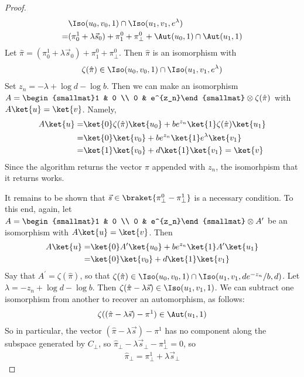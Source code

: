 \begin{proof}
\begin{align}
		& \Iso(u_0,v_0,1)\cap \Iso(u_1,v_1,e^\lambda) \\
		= & (\pi_0^1 + \lambda\vec s_0) + \pi_1^0 + \pi_\bot^0 + \Aut(u_0,1)\cap \Aut(u_1,1)
	\end{align}
	Let $\hat\pi = (\pi_0^1 + \lambda\vec s_0) + \pi_1^0 + \pi_\bot^0$.
	Then $\hat\pi$ is an isomorphism with 
	\begin{align}
		\zeta(\hat\pi) \in \Iso(u_0,v_0,1)\cap \Iso(u_1,v_1,e^\lambda)
	\end{align}
	Set $z_n=-\lambda+\log d - \log b$.
	Then we can make an isomorphism $A=\begin{smallmat}1 & 0 \\ 0 & e^{z_n}\end{smallmat}\otimes \zeta(\hat\pi)$ with $A\ket{u}=\ket{v}$.
	Namely,
	\begin{align}
		A\ket{u} = & \ket{0}\zeta(\hat\pi)\ket{u_0} + be^{z_n}\ket{1}\zeta(\hat\pi)\ket{u_1} \\
		= & \ket{0}\ket{v_0} + be^{z_n}\ket{1}e^{\lambda}\ket{v_1} \\
		= & \ket{1}\ket{v_0} + d\ket{1}\ket{v_1} = \ket{v}
	\end{align}
	Since the algorithm returns the vector $\hat\pi$ appended with $z_n$, the isomorhpism that it returns works.
	
	It remains to be shown that $\vec s\in \braket{\pi_\bot^0 - \pi_\bot^1}$ is a necessary condition.
	To this end, again, let $A=\begin{smallmat}1 & 0 \\ 0 & e^{z_n}\end{smallmat}\otimes A^\prime$ be an isomorphism with $A\ket{u}=\ket{v}$.
	Then
	\begin{align}
		A\ket{u} = & \ket{0}A^\prime\ket{u_0} + be^{z_n}\ket{1}A^\prime\ket{u_1} \\
		= & \ket{0}\ket{v_0} + d\ket{1}\ket{v_1}
	\end{align}
	Say that $A^\prime=\zeta(\hat\pi)$, so that $\zeta(\hat\pi)\in \Iso(u_0,v_0,1)\cap \Iso(u_1,v_1,de^{-z_n}/b,d)$.
	Let $\lambda=-z_n+\log d - \log b$.
	Then $\zeta(\hat\pi - \lambda\vec s)\in \Iso(u_1,v_1,1)$.
	We can subtract one isomorphism from another to recover an automorphism, as follows:
	\begin{align}
		\zeta((\hat\pi - \lambda\vec s) - \pi^1)\in \Aut(u_1,1)
	\end{align}
	So in particular, the vector $(\hat\pi - \lambda \vec s)-\pi^1$ has no component along the subspace generated by $C_\bot$, so $\hat\pi_\bot - \lambda\vec s_\bot - \pi_\bot^1=0$, so
	\begin{align}
		\label{eq:hat-pi-bot-expression}
		\hat\pi_\bot = \pi_\bot^1 +\lambda\vec s_\bot
	\end{align}
	

\end{proof}
